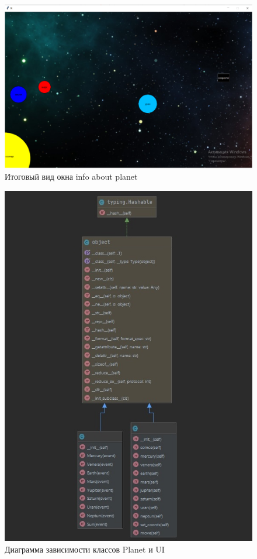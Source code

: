 \documentclass[11pt,a4paper]{report}
\begin{document}
\begin{figure}[h]
\centering
\includegraphics[width=0.78\linewidth]{1.png}
\caption{Итоговый вид окна info about planet}
\label{fig:mpr}

\end{figure}
\begin{figure}[h]
\centering
\includegraphics[width=1.0\linewidth]{otchet.jpg}
\caption{Диаграмма зависимости классов Planet и UI}
\label{fig:mpr}
\end{figure}
\end{document}
